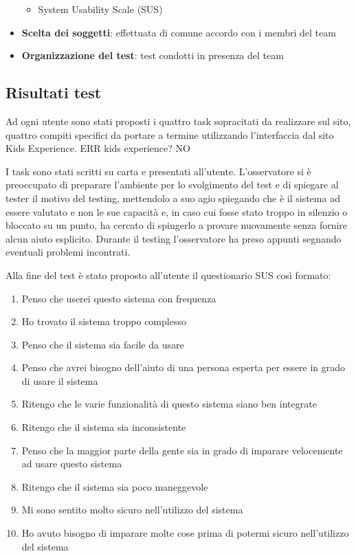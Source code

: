 \documentclass[12pt,italian,]{report}
\providecommand{\tightlist}{%
  \setlength{\itemsep}{0pt}\setlength{\parskip}{0pt}}
\begin{document}
\begin{itemize}
  \begin{itemize}
  \tightlist
  \item
    System Usability Scale (SUS)
  \end{itemize}
\item
  \textbf{Scelta dei soggetti}: effettuata di comune accordo con i
  membri del team
\item
  \textbf{Organizzazione del test}: test condotti in presenza del team
\end{itemize}

\hypertarget{risultati-test}{%
\subsection{Risultati test}\label{risultati-test}}

Ad ogni utente sono stati proposti i quattro task sopracitati da
realizzare sul sito, quattro compiti specifici da portare a termine
utilizzando l'interfaccia dal sito Kids Experience. ERR kids experience?
NO

I task sono stati scritti su carta e presentati all'utente.
L'osservatore si è preoccupato di preparare l'ambiente per lo
svolgimento del test e di spiegare al tester il motivo del testing,
mettendolo a suo agio spiegando che è il sistema ad essere valutato e
non le sue capacità e, in caso cui fosse stato troppo in silenzio o
bloccato su un punto, ha cercato di spingerlo a provare nuovamente senza
fornire alcun aiuto esplicito. Durante il testing l'osservatore ha preso
appunti segnando eventuali problemi incontrati.

Alla fine del test è stato proposto all'utente il questionario SUS così
formato:

\begin{enumerate}
\def\labelenumi{\arabic{enumi}.}
\tightlist
\item
  Penso che userei questo sistema con frequenza
\item
  Ho trovato il sistema troppo complesso
\item
  Penso che il sistema sia facile da usare
\item
  Penso che avrei bisogno dell'aiuto di una persona esperta per essere
  in grado di usare il sistema
\item
  Ritengo che le varie funzionalità di questo sistema siano ben
  integrate
\item
  Ritengo che il sistema sia inconsistente
\item
  Penso che la maggior parte della gente sia in grado di imparare
  velocemente ad usare questo sistema
\item
  Ritengo che il sistema sia poco maneggevole
\item
  Mi sono sentito molto sicuro nell'utilizzo del sistema
\item
  Ho avuto bisogno di imparare molte cose prima di potermi sicuro
  nell'utilizzo del sistema
\end{enumerate}
\end{document}
